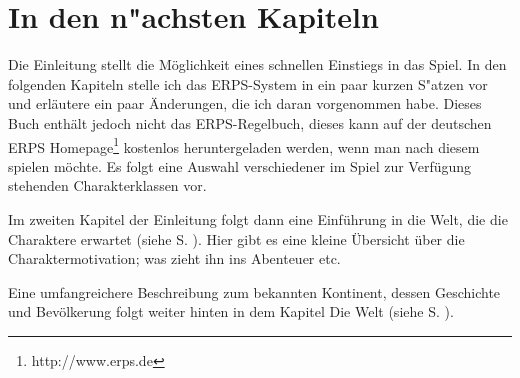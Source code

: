 \section*{In den n"achsten Kapiteln}

Die Einleitung stellt die Möglichkeit eines schnellen Einstiegs in das 
Spiel. In den folgenden Kapiteln stelle ich das ERPS-System in ein paar 
kurzen S"atzen vor und erläutere ein paar Änderungen, die ich daran 
vorgenommen habe. Dieses Buch enthält jedoch nicht das ERPS-Regelbuch\cite{erps1}, 
dieses kann auf der deutschen ERPS Homepage\footnote{http://www.erps.de} kostenlos 
heruntergeladen werden, wenn man nach diesem spielen möchte. 
Es folgt eine Auswahl verschiedener im Spiel zur Verfügung stehenden 
Charakterklassen vor. 

\par Im zweiten Kapitel der Einleitung folgt dann eine Einführung in die Welt, 
die die Charaktere erwartet (siehe S. \pageref{spielweltbeschreibung}). Hier 
gibt es eine kleine Übersicht über die Charaktermotivation; was zieht ihn ins 
Abenteuer etc.
\par Eine umfangreichere Beschreibung zum bekannten Kontinent, dessen Geschichte 
und Bevölkerung folgt weiter hinten in dem Kapitel \glqq Die Welt\grqq{} 
(siehe S. \pageref{diewelt}).
